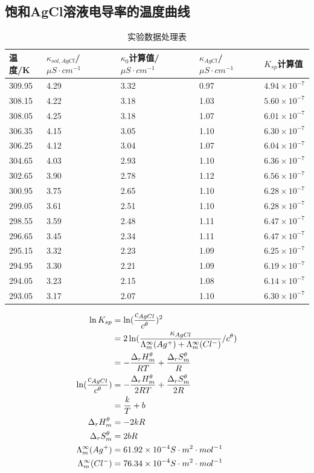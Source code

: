 \documentclass[a4paper]{article}
\begin{document}
\subsection{饱和AgCl溶液电导率的温度曲线}
\begin{table}[H]
	\caption{实验数据处理表}
	\begin{center}
		\begin{tabular}{lllll}
			\hline
			温度/K 	&$\kappa_{sol, AgCl}$/$\mu S\cdot cm^{-1}$ 
			& $\kappa_{0}$计算值/$\mu S\cdot cm^{-1}$& $\kappa_{AgCl}$/$\mu S\cdot cm^{-1}$
			&$K_{sp}$计算值\\
			\hline
			309.95&4.29&3.32&0.97&$4.94\times 10^{-7}$ \\
			308.15&4.22&3.18&1.03&$5.60\times 10^{-7}$ \\
			308.05&4.25&3.18&1.07&$6.01\times 10^{-7}$ \\
			306.35&4.15&3.05&1.10&$6.30\times 10^{-7}$ \\
			306.25&4.12&3.04&1.07&$6.04\times 10^{-7}$ \\
			304.65&4.03&2.93&1.10&$6.36\times 10^{-7}$ \\
			302.65&3.90&2.78&1.12&$6.56\times 10^{-7}$ \\
			300.95&3.75&2.65&1.10&$6.28\times 10^{-7}$ \\
			299.05&3.61&2.51&1.10&$6.28\times 10^{-7}$  \\
			298.55&3.59&2.48&1.11&$6.47\times 10^{-7}$  \\
			296.65&3.45&2.34&1.11&$6.47\times 10^{-7}$  \\
			295.15&3.32&2.23&1.09&$6.25\times 10^{-7}$ \\
			294.95&3.30&2.21&1.09&$6.19\times 10^{-7}$ \\
			294.05&3.23&2.15&1.08&$6.14\times 10^{-7}$ \\
			293.05&3.17&2.07&1.10&$6.30\times 10^{-7}$  \\
			\hline
		 \end{tabular}
	\end{center}
\end{table}
\begin{equation}
	\centering
	\begin{aligned}
		\ln K_{sp} &= \ln  (\frac{c_{AgCl}}{c^{\theta}})^{2}\\
		&=2\ln(\frac{\kappa_{AgCl}}{\Lambda^{\infty}_{m}(Ag^{+})+\Lambda^{\infty}_{m}(Cl^{-})} / c^{\theta})\\
		&=-\frac{\Delta_{r}H^{\theta}_{m}}{RT} + \frac{\Delta_{r}S^{\theta}_{m}}{R}\\
		\ln  (\frac{c_{AgCl}}{c^{\theta}}) &= -\frac{\Delta_{r}H^{\theta}_{m}}{2RT} + \frac{\Delta_{r}S^{\theta}_{m}}{2R}\\
		&= \frac{k}{T} + b\\
		\Delta_{r}H^{\theta}_{m} &= -2kR\\
		\Delta_{r}S^{\theta}_{m} &= 2bR\\
		\Lambda^{\infty}_{m}(Ag^{+}) &= 61.92 \times 10^{-4} S\cdot m^{2} \cdot mol^{-1}\\
		\Lambda^{\infty}_{m}(Cl^{-}) &= 76.34 \times 10^{-4} S\cdot m^{2} \cdot mol^{-1}\\
	\end{aligned}
\end{equation}
\end{document}
